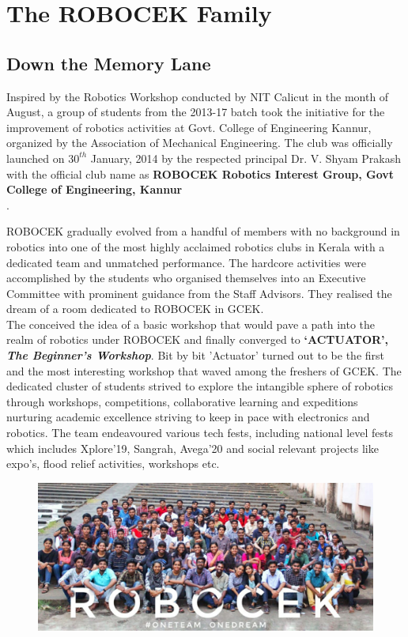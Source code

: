 \chapter{The ROBOCEK Family}

\section{Down the Memory Lane}

Inspired by the Robotics Workshop conducted by NIT Calicut in the month of August, a group of students from the 2013-17 batch took the initiative for the improvement of robotics activities at Govt. College of Engineering Kannur, organized by the Association of Mechanical Engineering. The club was officially launched on $30^{th}$ January, 2014 by the respected principal Dr. V. Shyam Prakash with the official club name as \textbf{ROBOCEK Robotics Interest Group, Govt College of Engineering, Kannur} \\.

ROBOCEK gradually evolved from a handful of members with no background in robotics into one of the most highly acclaimed robotics clubs in Kerala with a dedicated team and unmatched performance. The hardcore activities were accomplished by the students who organised themselves into an Executive Committee with prominent guidance from the Staff Advisors. They realised the dream of a room dedicated to ROBOCEK in GCEK. \\

The conceived the idea of a basic workshop that would pave a path into the realm of robotics under ROBOCEK and finally converged to \textbf{‘ACTUATOR’, \textit{The Beginner’s Workshop}}. Bit by bit ’Actuator’ turned out to be the first and the most interesting workshop that waved among the freshers of GCEK. The dedicated cluster of students strived to explore the intangible sphere of robotics through workshops, competitions, collaborative learning and expeditions nurturing academic excellence striving to keep in pace with electronics and robotics. The team endeavoured various tech fests, including national level fests which includes Xplore’19, Sangrah, Avega’20 and social relevant projects like expo’s, flood relief activities, workshops etc.

\begin{figure}[!h]
	\centering
	\includegraphics[width=\textwidth]{Images/robocek.jpeg}
\end{figure}


